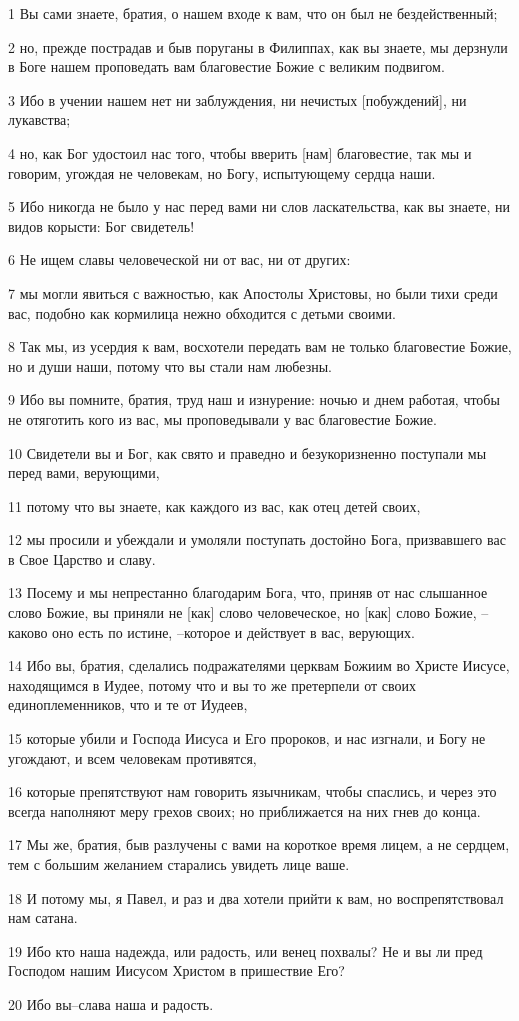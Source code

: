 \par 1 Вы сами знаете, братия, о нашем входе к вам, что он был не бездейственный;
\par 2 но, прежде пострадав и быв поруганы в Филиппах, как вы знаете, мы дерзнули в Боге нашем проповедать вам благовестие Божие с великим подвигом.
\par 3 Ибо в учении нашем нет ни заблуждения, ни нечистых [побуждений], ни лукавства;
\par 4 но, как Бог удостоил нас того, чтобы вверить [нам] благовестие, так мы и говорим, угождая не человекам, но Богу, испытующему сердца наши.
\par 5 Ибо никогда не было у нас перед вами ни слов ласкательства, как вы знаете, ни видов корысти: Бог свидетель!
\par 6 Не ищем славы человеческой ни от вас, ни от других:
\par 7 мы могли явиться с важностью, как Апостолы Христовы, но были тихи среди вас, подобно как кормилица нежно обходится с детьми своими.
\par 8 Так мы, из усердия к вам, восхотели передать вам не только благовестие Божие, но и души наши, потому что вы стали нам любезны.
\par 9 Ибо вы помните, братия, труд наш и изнурение: ночью и днем работая, чтобы не отяготить кого из вас, мы проповедывали у вас благовестие Божие.
\par 10 Свидетели вы и Бог, как свято и праведно и безукоризненно поступали мы перед вами, верующими,
\par 11 потому что вы знаете, как каждого из вас, как отец детей своих,
\par 12 мы просили и убеждали и умоляли поступать достойно Бога, призвавшего вас в Свое Царство и славу.
\par 13 Посему и мы непрестанно благодарим Бога, что, приняв от нас слышанное слово Божие, вы приняли не [как] слово человеческое, но [как] слово Божие, --каково оно есть по истине, --которое и действует в вас, верующих.
\par 14 Ибо вы, братия, сделались подражателями церквам Божиим во Христе Иисусе, находящимся в Иудее, потому что и вы то же претерпели от своих единоплеменников, что и те от Иудеев,
\par 15 которые убили и Господа Иисуса и Его пророков, и нас изгнали, и Богу не угождают, и всем человекам противятся,
\par 16 которые препятствуют нам говорить язычникам, чтобы спаслись, и через это всегда наполняют меру грехов своих; но приближается на них гнев до конца.
\par 17 Мы же, братия, быв разлучены с вами на короткое время лицем, а не сердцем, тем с большим желанием старались увидеть лице ваше.
\par 18 И потому мы, я Павел, и раз и два хотели прийти к вам, но воспрепятствовал нам сатана.
\par 19 Ибо кто наша надежда, или радость, или венец похвалы? Не и вы ли пред Господом нашим Иисусом Христом в пришествие Его?
\par 20 Ибо вы--слава наша и радость.

